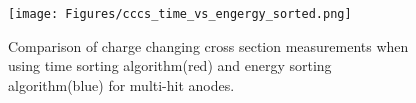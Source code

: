 \begin{appendices}
\begin{figure}[htpb]
    \centering
    \texttt{[image: Figures/cccs\_time\_vs\_engergy\_sorted.png]}
    \caption{
    Comparison of charge changing cross section measurements when using time sorting algorithm(red) and energy sorting algorithm(blue) for multi-hit anodes.
     }
    \label{fig:cccs_gaus_time_vs_energy}
\end{figure}

\clearpage

\end{appendices}
